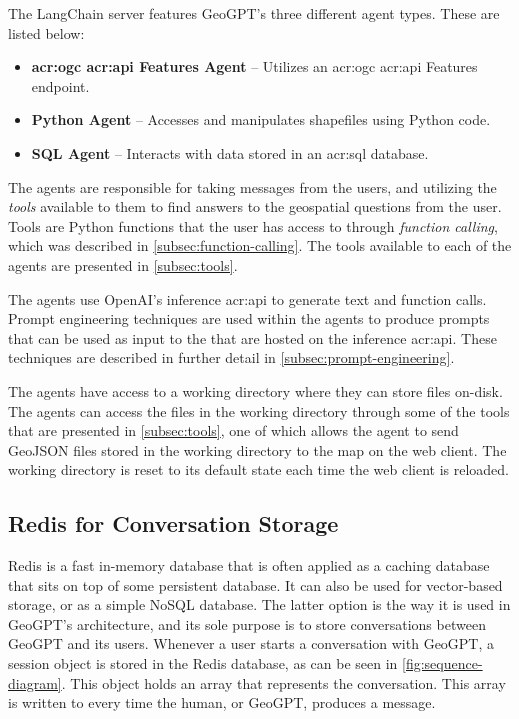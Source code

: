 The LangChain server features GeoGPT's three different agent types. These are listed below:

\begin{itemize}
    \item \textbf{\acrshort{acr:ogc} \acrshort{acr:api} Features Agent} -- Utilizes an \acrshort{acr:ogc} \acrshort{acr:api} Features endpoint.
    \item \textbf{Python Agent} -- Accesses and manipulates shapefiles using Python code.
    \item \textbf{SQL Agent} -- Interacts with data stored in an \acrshort{acr:sql} database.
\end{itemize}

The agents are responsible for taking messages from the users, and utilizing the \textit{tools} available to them to find answers to the geospatial questions from the user. Tools are Python functions that the user has access to through \textit{function calling}, which was described in \autoref{subsec:function-calling}. The tools available to each of the agents are presented in \autoref{subsec:tools}.

The agents use OpenAI's inference \acrshort{acr:api} to generate text and function calls. Prompt engineering techniques are used within the agents to produce prompts that can be used as input to the  that are hosted on the inference \acrshort{acr:api}. These techniques are described in further detail in \autoref{subsec:prompt-engineering}.

The agents have access to a working directory where they can store files on-disk. The agents can access the files in the working directory through some of the tools that are presented in \autoref{subsec:tools}, one of which allows the agent to send GeoJSON files stored in the working directory to the map on the web client. The working directory is reset to its default state each time the web client is reloaded.


\subsection{Redis for Conversation Storage}
\label{subsec:redis-architecture}

Redis \citep{sanfilippoRedisRealtimeData2009} is a fast in-memory database that is often applied as a caching database that sits on top of some persistent database. It can also be used for vector-based storage, or as a simple NoSQL database. The latter option is the way it is used in GeoGPT's architecture, and its sole purpose is to store conversations between GeoGPT and its users. Whenever a user starts a conversation with GeoGPT, a session object is stored in the Redis database, as can be seen in \autoref{fig:sequence-diagram}. This object holds an array that represents the conversation. This array is written to every time the human, or GeoGPT, produces a message.

